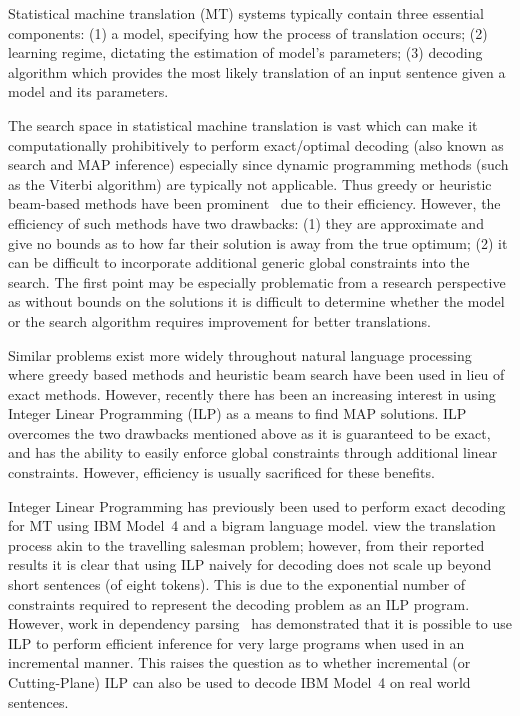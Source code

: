 Statistical machine translation (MT) systems typically contain three
essential components: (1) a model, specifying how the process of
translation occurs; (2) learning regime, dictating the estimation of
model's parameters; (3) decoding algorithm which provides the most
likely translation of an input sentence given a model and its
parameters.

The search space in statistical machine translation is vast which can
make it computationally prohibitively to perform exact/optimal
decoding (also known as search and MAP inference) especially since
dynamic programming methods (such as the Viterbi algorithm) are
typically not applicable.  Thus greedy or heuristic beam-based methods
have been prominent~\citep{moses} due to their efficiency.  However,
the efficiency of such methods have two drawbacks: (1) they are
approximate and give no bounds as to how far their solution is away
from the true optimum; (2) it can be difficult to incorporate
additional generic global constraints into the search.  The first
point may be especially problematic from a research perspective as
without bounds on the solutions it is difficult to determine whether
the model or the search algorithm requires improvement for better
translations.

Similar problems exist more widely throughout natural language
processing where greedy based methods and heuristic beam search have
been used in lieu of exact methods.  However, recently there has been
an increasing interest in using Integer Linear Programming (ILP) as a
means to find MAP solutions.  ILP overcomes the two drawbacks
mentioned above as it is guaranteed to be exact, and has the ability
to easily enforce global constraints through additional linear
constraints.  However, efficiency is usually sacrificed for these
benefits.

Integer Linear Programming has previously been used to perform exact
decoding for MT using IBM Model~4 and a bigram language model.
\cite{GermannFast04} view the translation process akin to the
travelling salesman problem; however, from their reported results it
is clear that using ILP naively for decoding does not scale up beyond
short sentences (of eight tokens).  This is due to the exponential
number of constraints required to represent the decoding problem as an
ILP program.  However, work in dependency
parsing~\citep{riedel06incremental} has demonstrated that it is
possible to use ILP to perform efficient inference for very large
programs when used in an incremental manner.  This raises the question
as to whether incremental (or Cutting-Plane) ILP can also be used to
decode IBM Model~4 on real world sentences.

